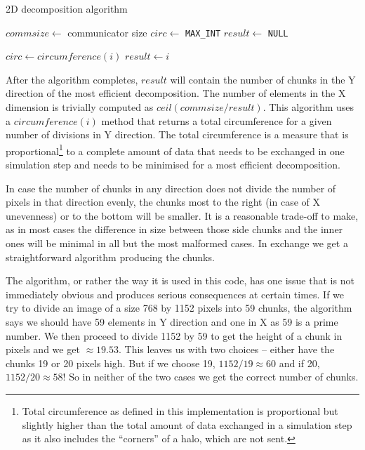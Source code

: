 \documentclass[11pt,a4paper]{article}
\begin{document}
\begin{algorithm}
    \caption{2D decomposition algorithm}\label{2dcomp}
    \begin{algorithmic}[1]
        \State $commsize\gets$ communicator size
        \State $circ\gets$ \texttt{MAX\_INT}
        \State $result\gets$ \texttt{NULL}

                \State $circ\gets circumference(i)$
                \State $result\gets i$
            \EndIf
        \EndFor
    \end{algorithmic}
\end{algorithm}

After the algorithm completes, $result$ will contain the number of chunks in the Y direction of the most efficient decomposition. 
The number of elements in the X dimension is trivially computed as $ceil(commsize / result)$. 
This algorithm uses a $circumference(i)$ method that returns a total circumference for a given number of divisions in Y direction. 
The total circumference is a measure that is proportional\footnote{Total circumference as defined in this implementation is proportional but slightly higher than the total amount of data exchanged in a simulation step as it also includes the ``corners'' of a halo, which are not sent.} to a complete amount of data that needs to be exchanged in one simulation step and needs to be minimised for a most efficient decomposition. 

In case the number of chunks in any direction does not divide the number of pixels in that direction evenly, the chunks most to the right (in case of X unevenness) or to the bottom will be smaller. 
It is a reasonable trade-off to make, as in most cases the difference in size between those side chunks and the inner ones will be minimal in all but the most malformed cases. 
In exchange we get a straightforward algorithm producing the chunks.

The algorithm, or rather the way it is used in this code, has one issue that is not immediately obvious and produces serious consequences at certain times. 
If we try to divide an image of a size 768 by 1152 pixels into 59 chunks, the algorithm says we should have 59 elements in Y direction and one in X as 59 is a prime number. 
We then proceed to divide 1152 by 59 to get the height of a chunk in pixels and we get $\approx 19.53$. 
This leaves us with two choices -- either have the chunks 19 or 20 pixels high. But if we choose 19, $1152 / 19\approx 60$ and if 20, $1152 / 20\approx 58$! So in neither of the two cases we get the correct number of chunks.
\end{document}
